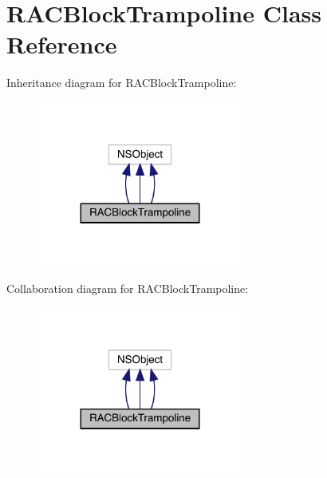 \hypertarget{interface_r_a_c_block_trampoline}{}\section{R\+A\+C\+Block\+Trampoline Class Reference}
\label{interface_r_a_c_block_trampoline}


Inheritance diagram for R\+A\+C\+Block\+Trampoline\+:\nopagebreak
\begin{figure}[H]
\begin{center}
\leavevmode
\includegraphics[width=191pt]{interface_r_a_c_block_trampoline__inherit__graph}
\end{center}
\end{figure}


Collaboration diagram for R\+A\+C\+Block\+Trampoline\+:\nopagebreak
\begin{figure}[H]
\begin{center}
\leavevmode
\includegraphics[width=191pt]{interface_r_a_c_block_trampoline__coll__graph}
\end{center}
\end{figure}
